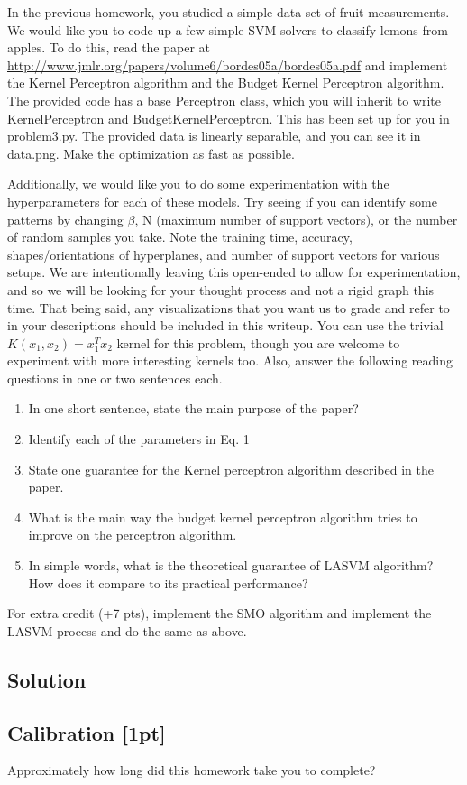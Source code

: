 \documentclass[submit]{harvardml}
\begin{document}
\newpage
\begin{problem}



In the previous homework, you studied a simple data set of fruit measurements.
We would like you to code up a few simple SVM solvers to classify lemons from
apples. To do this, read the paper at
\url{http://www.jmlr.org/papers/volume6/bordes05a/bordes05a.pdf} and implement
the Kernel Perceptron algorithm and the Budget Kernel Perceptron algorithm. The provided code has a base Perceptron class, which you will inherit to write KernelPerceptron and BudgetKernelPerceptron. This has been set up for you in problem3.py. The provided data is linearly separable, and you can see it in data.png. Make the optimization as fast as
possible. 

Additionally, we would like you to do some experimentation with the hyperparameters for each of these models. Try seeing if you can identify some patterns by changing $\beta$, N (maximum number of support vectors), or the number of random samples you take.  Note the training time, accuracy,  shapes/orientations of hyperplanes, and number of support vectors for various setups. We are intentionally leaving this open-ended to allow for experimentation, and so we will be looking for your thought process and not a rigid graph this time. That being said, any visualizations that you want us to grade and refer to in your descriptions should be included in this writeup. You can use the trivial $K(x_1, x_2) = x_1^Tx_2$ kernel for this problem, though you are welcome to experiment with more interesting kernels too. Also, answer the following reading questions in one or two sentences each.

\begin{enumerate}
\item In one short sentence, state the main purpose of the paper?
\item Identify each of the parameters in Eq. 1
\item State one guarantee for the Kernel perceptron algorithm described in the
  paper.
\item What is the main way the budget kernel perceptron algorithm tries to
  improve on the perceptron algorithm.
\item In simple words, what is the theoretical guarantee of LASVM algorithm? How
  does it compare to its practical performance?
\end{enumerate}


For extra credit (+7 pts), implement the SMO algorithm and implement the LASVM process and do the same as above.




\end{problem}

\subsection*{Solution}



\newpage

\subsection*{Calibration [1pt]}
Approximately how long did this homework take you to complete?
\end{document}
